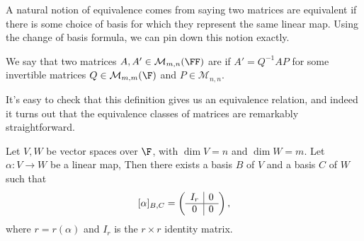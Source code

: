 A natural notion of equivalence comes from saying 
two matrices are equivalent if there is some choice of basis for which they represent the same linear map. Using the change of basis formula, we can pin down this notion exactly.

\begin{definition}
    We say that two matrices $A, A' \in \mathcal{M}_{m, n}(\FF)$ are  if $A' = Q^{-1}AP$ for some invertible matrices $Q \in \mathcal{M}_{m, m}(\F)$ and $P \in \mathcal{M}_{n, n}$.    
\end{definition}

It's easy to check that this definition gives us an equivalence relation, and indeed it turns out that the equivalence classes of matrices are remarkably straightforward.

\begin{proposition}
    Let $V, W$ be vector spaces over $\F$, with $\dim V = n$ and $\dim W = m$. Let $\alpha: V \rightarrow W$ be a linear map, Then there exists a basis $B$ of $V$ and a basis $C$ of $W$ such that
    $$
    [\alpha]_{B, C} = \left(\begin{array}{ c | c }
        I_r & 0 \\
        \hline
        0 & 0
      \end{array}\right),
    $$
    where $r = r(\alpha)$ and $I_r$ is the $r \times r$ identity matrix.
\end{proposition}
